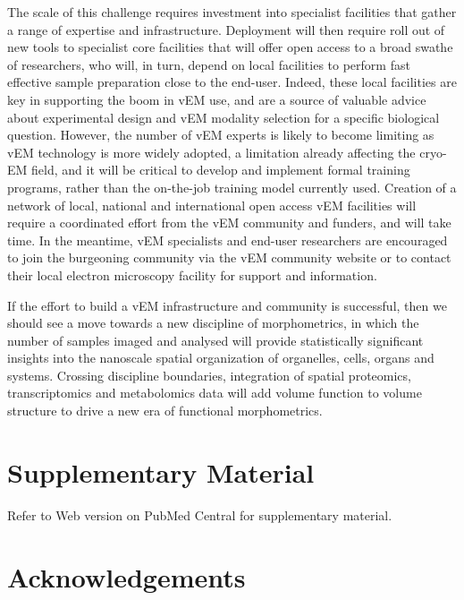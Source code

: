 \documentclass{article}
\begin{document}
The scale of this challenge requires investment into specialist facilities that gather a range of expertise and infrastructure. Deployment will then require roll out of new tools to specialist core facilities that will offer open access to a broad swathe of researchers, who will, in turn, depend on local facilities to perform fast effective sample preparation close to the end-user. Indeed, these local facilities are key in supporting the boom in vEM use, and are a source of valuable advice about experimental design and vEM modality selection for a specific biological question. However, the number of vEM experts is likely to become limiting as vEM technology is more widely adopted, a limitation already affecting the cryo-EM field, and it will be critical to develop and implement formal training programs, rather than the on-the-job training model currently used. Creation of a network of local, national and international open access vEM facilities will require a coordinated effort from the vEM community and funders, and will take time. In the meantime, vEM specialists and end-user researchers are encouraged to join the burgeoning community via the vEM community website or to contact their local electron microscopy facility for support and information.


If the effort to build a vEM infrastructure and community is successful, then we should see a move towards a new discipline of morphometrics, in which the number of samples imaged and analysed will provide statistically significant insights into the nanoscale spatial organization of organelles, cells, organs and systems. Crossing discipline boundaries, integration of spatial proteomics, transcriptomics and metabolomics data will add volume function to volume structure to drive a new era of functional morphometrics.

\section*{Supplementary Material}

Refer to Web version on PubMed Central for supplementary material.

\section*{Acknowledgements}
\end{document}
